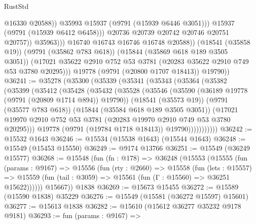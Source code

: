 \begin{lexlean}{RustStd}
\begin{coremodule}
                                @16330
                                @20588))
                            @35993
                            @15937
                            (@9791 (@15939 @6446 @3051)))
                          @15937
                          (@9791 (@15939 @6412 @6458)))
                        @20736
                        @20739
                        @20742
                        @20746
                        @20751
                        @20757))
                    @35963)))
              @16740
              @16743
              @16746
              @16748
              @20588))
          (@18541 (@35858 @19))
          (@9791 (@35862 @783 @618))
          (@15844 (@35869 @618 @189 @3505 @3051))
          (@17021 @35622 @2910 @752 @53 @3781 (@20283 @35622 @2910 @749 @53 @3780 @20295)))
        @19778
        (@9791 (@20800 @1707 @18413))
        @19790))
@36241 := @35278
    (@35300
      (@35339
        (@35341
          (@35343
            (@35364
              (@35382
                (@35399
                  (@35412
                    (@35428
                      (@35432
                        (@35528
                          (@35546
                            (@35590 (@36189 @19778 (@9791 (@20809 @1714 @894)) @19790))
                            (@18541 (@35573 @19))
                            (@9791 (@35577 @783 @618))
                            (@15844 (@35584 @618 @189 @3505 @3051))
                            (@17021
                              @19970
                              @2910
                              @752
                              @53
                              @3781
                              (@20283 @19970 @2910 @749 @53 @3780 @20295)))
                          @19778
                          (@9791 (@19784 @1718 @18413))
                          @19790)))))))))))
@36242 := @15532 @1643
@36246 := @15534 (@15538 @1643) (@15544 @1643)
@36248 := @15549 (@15453 @15550)
@36249 := @9174 @13766
@36251 := @15549 (@36249 @15577)
@36268 := @15548
    (fun (fn : @178) =>
    @36248
      (@15553
        (@15555
          (fun (params : @9167) =>
          @15556
            (fun (rty : @2660) =>
            @15558
              (fun (lets : @15557) =>
              @15559 (fun (tail : @3059) => @15561 (fun (Γ : @15560) => @36251 @15622))))))
        @15667))
    @1838
@36269 := @15673 @15455
@36272 := @15589 (@15590 @1838) @35229
@36276 := @15549 (@15581 (@36272 @15597) @15601)
@36277 := @15613 @1838
@36282 := @15610 (@15612 @36277 @35232 @9178 @9181)
@36293 := fun (params : @9167) =>

\end{coremodule}
\end{lexlean}
